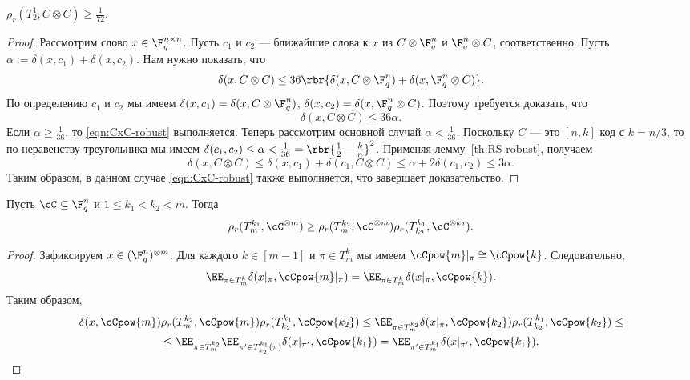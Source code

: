 \documentclass[russian]{intsys}
\begin{document}
\begin{corollary}\label{col:RS-robust}
    $\rho_r(T_2^1, C\otimes C)\ge \frac{1}{72}$.
\end{corollary}

\begin{proof}
    Рассмотрим слово $x\in \F_q^{n\times n}$. Пусть $c_1$ и $c_2$ --- ближайшие слова к $x$ из $C\otimes \F_q^n$ и $\F_q^n\otimes C$, соответственно. Пусть $\alpha:=\delta(x,c_1)+\delta(x,c_2)$. Нам нужно показать, что 
    \begin{equation*}
        \delta(x, C\otimes C)\le 36\rbr{\delta(x,C\otimes \F_q^n)+\delta(x,\F_q^n\otimes C)}.
    \end{equation*}
    По определению $c_1$ и $c_2$ мы имеем $\delta(x,c_1)=\delta(x,C\otimes \F_q^n)$, $\delta(x,c_2)=\delta(x,\F_q^n\otimes C)$. Поэтому требуется доказать, что
    \begin{equation}\label{eqn:CxC-robust}
        \delta(x,C\otimes C)\le 36 \alpha.
    \end{equation}
    Если $\alpha\ge \frac{1}{36}$, то \eqref{eqn:CxC-robust} выполняется. Теперь рассмотрим основной случай $\alpha<\frac{1}{36}$. Поскольку $C$ --- это $[n,k]$ код с $k=n/3$, то по неравенству треугольника мы имеем $\delta(c_1,c_2)\le\alpha<\frac{1}{36}=\rbr{\frac 12-\frac kn}^2$. 
    Применяя лемму~\ref{th:RS-robust}, получаем
    $$\delta(x,C\otimes C)\le \delta(x,c_1)+\delta(c_1,C\otimes C)\le \alpha+2\delta(c_1,c_2)\le 3\alpha.$$
    Таким образом, в данном случае \eqref{eqn:CxC-robust} также выполняется, что завершает доказательство.
\end{proof}
\newcommand{\cCn}[1]{\cC^{\widehat{(#1)}}}
\newcommand{\cCp}[1]{\cC^{(#1)}}
\newcommand{\prodC}[1][\cC]{\otimes #1}

\begin{lemma}\label{lemma:robust-combine}
   Пусть $\cC\subseteq \F_q^n$ и $1\le k_1<k_2<m$. Тогда
   \[\rho_r(T_m^{k_1},\cC^{\otimes m})\ge \rho_r(T_m^{k_2},\cC^{\otimes m})\rho_r(T_{k_2}^{k_1},\cC^{\otimes k_2}).\]
\end{lemma}

\begin{proof}
Зафиксируем $x\in (\F_q^n)^{\otimes m}$. Для каждого $k\in[m-1]$ и $\pi\in T_m^{k}$ мы имеем $\cCpow{m}|_\pi\cong \cCpow{k}$. Следовательно,
\[
\EE_{\pi\in T_m^{k}}\delta(x|_{\pi}, \cCpow{m}|_\pi)=\EE_{\pi\in T_m^{k}}\delta(x|_{\pi}, \cCpow{k}).
\]
Таким образом, 
\begin{multline*}
\delta(x, \cCpow{m})\rho_r(T_m^{k_2},\cCpow{m})\rho_r(T_{k_2}^{k_1},\cCpow{k_2})
\le \EE_{\pi\in T_m^{k_2}}\delta(x|_\pi,\cCpow{k_2})\rho_r(T_{k_2}^{k_1},\cCpow{k_2})\le \\
\le \EE_{\pi\in T_m^{k_2}}\EE_{\pi'\in T_{k_2}^{k_1}(\pi)}\delta(x|_{\pi'},\cCpow{k_1}) = \EE_{\pi'\in T_m^{k_1}}\delta(x|_{\pi'},\cCpow{k_1}).
\end{multline*}
\end{proof}
\end{document}
